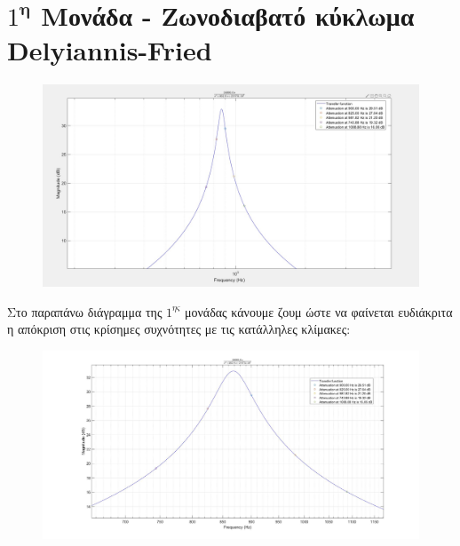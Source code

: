 \documentclass{article}
\begin{document}
{{\section*{$1^\textbf{η}$ Μονάδα - Ζωνοδιαβατό κύκλωμα Delyiannis-Fried} 
  \begin{figure}[h!]
\centering
 	\advance\leftskip-2cm
  \includegraphics[width=160mm,scale=2]{thema2/matlab0.jpg}
\end{figure} 
\normalsize{}
Στο παραπάνω διάγραμμα της $1^{ης}$ μονάδας κάνουμε ζουμ ώστε να φαίνεται ευδιάκριτα η απόκριση στις κρίσημες συχνότητες με τις κατάλληλες κλίμακες:
\large{}
  \begin{figure}[h!]
\centering
 	\advance\leftskip-1cm
  \includegraphics[width=120mm,scale=2]{thema2/z1.jpg}
\end{figure} 
\newpage
}}
\end{document}
